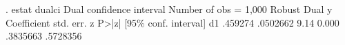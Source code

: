 . estat dualci
{\smallskip}
Dual confidence interval                                 Number of obs = 1,000
             {\VBAR}               Robust                               Dual
           y {\VBAR} Coefficient  std. err.      z    P>|z|     [95\% conf. interval]
          d1 {\VBAR}    .459274   .0502662     9.14   0.000     .3835663    .5728356

